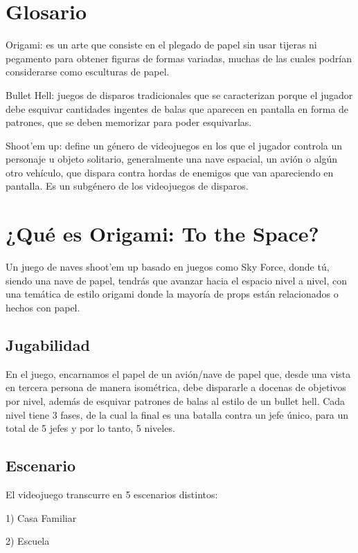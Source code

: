 \documentclass{article}
\begin{document}
\section{Glosario} 
Origami: es un arte que consiste en el plegado de papel sin usar tijeras ni pegamento para obtener figuras de formas variadas, muchas de las cuales podrían considerarse como esculturas de papel.\vspace{0.5cm}

Bullet Hell: juegos de disparos tradicionales que se caracterizan porque el jugador debe esquivar cantidades ingentes de balas que aparecen en pantalla en forma de patrones, que se deben memorizar para poder esquivarlas.\vspace{0.5cm}

Shoot'em up: define un género de videojuegos en los que el jugador controla un personaje u objeto solitario, generalmente una nave espacial, un avión o algún otro vehículo, que dispara contra hordas de enemigos que van apareciendo en pantalla. Es un subgénero de los videojuegos de disparos.

\section{¿Qué es Origami: To the Space?} \label{contenido}
Un juego de naves shoot'em up  basado en juegos como Sky Force, donde tú, siendo una nave de papel, tendrás que avanzar hacia el espacio nivel a nivel, con una temática de estilo origami donde la mayoría de props están relacionados o hechos con papel.



\subsection{Jugabilidad}
En el juego, encarnamos el papel de un avión/nave de papel que, desde una vista en tercera persona de manera isométrica, debe dispararle a docenas de objetivos por nivel, además de esquivar patrones de balas al estilo de un bullet hell. Cada nivel tiene 3 fases, de la cual la final es una batalla contra un jefe único, para un total de 5 jefes y por lo tanto, 5 niveles.
\subsection{Escenario}
El videojuego transcurre en 5 escenarios distintos:

1) Casa Familiar

2) Escuela
\end{document}
